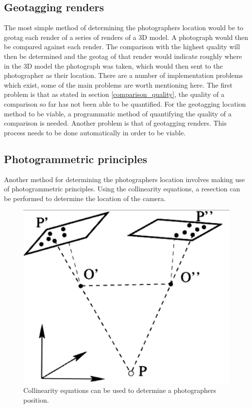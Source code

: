 \documentclass[11pt,a4paper]{report}
\begin{document}
		\subsection{Geotagging renders}
			The most simple method of determining the photographers location would be to geotag each render of a series of renders of a 3D model. A photograph would then be compared against each render. The comparison with the highest quality will then be determined and the geotag of that render would indicate roughly where in the 3D model the photograph was taken, which would then sent to the photographer as their location.
			There are a number of implementation problems which exist, some of the main problems are worth mentioning here.
			The first problem is that as stated in section \ref{comparison_quality}, the quality of a comparison so far has not been able to be quantified. For the geotagging location method to be viable, a programmatic method of quantifying the quality of a comparison is needed.
			Another problem is that of geotagging renders. This process needs to be done automatically in order to be viable.
		\subsection{Photogrammetric principles}
			Another method for determining the photographers location involves making use of photogrammetric principles. Using the collinearity equations, a resection can be performed to determine the location of the camera.
			\begin{figure}[H]
				\centering
				\includegraphics[width=1\textwidth]{collinearity_equations}
				\caption[Collinearity Equations]{Collinearity equations can be used to determine a photographers position.}
				\label{fig:collinearity_equations}
			\end{figure}
			
\newpage
\printbibliography
\end{document}

